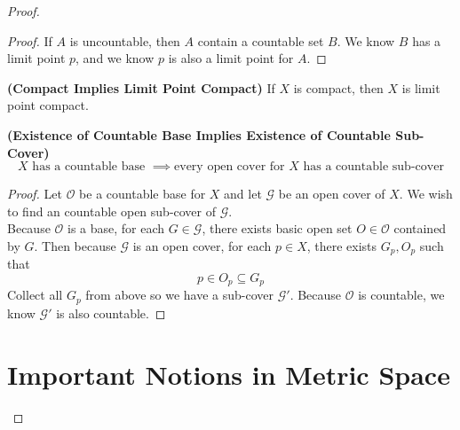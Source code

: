 \documentclass{report}
\begin{document}
\begin{proof}
\begin{proof}
If $A$ is uncountable, then  $A$ contain a countable set  $B$. We know  $B$ has a limit point  $p$, and we know  $p$ is also a limit point for $A$.
\end{proof}
\begin{corollary}
\label{2.6.8}
\textbf{(Compact Implies Limit Point Compact)} If $X$ is compact, then $X$ is limit point compact.
\end{corollary}
\begin{theorem}
\label{2.6.9}
\textbf{(Existence of Countable Base Implies Existence of Countable Sub-Cover)} 
\begin{equation*}
X\text{ has a countable base }\implies\text{every open cover for $X$ has a countable sub-cover}
\end{equation*}
\end{theorem}
\begin{proof}
Let $\mathcal{O}$ be a countable base for $X$ and let $\mathcal{G}$ be an open cover of $X$. We wish to find an countable open sub-cover of $\mathcal{G}$.\\

Because $\mathcal{O}$ is a base, for each $G\in \mathcal{G}$, there exists basic open set $O\in \mathcal{O}$ contained by $G$. Then because  $\mathcal{G}$ is an open cover, for each $p\in X$, there exists $G_p,O_p$ such that
\begin{equation*}
p\in O_p\subseteq G_p
\end{equation*}
Collect all $G_p$ from above so we have a sub-cover $\mathcal{G}'$. Because $\mathcal{O}$ is countable, we know $\mathcal{G}'$ is also countable.
\end{proof}
\chapter{Important Notions in Metric Space}

\end{proof}
\end{document}

